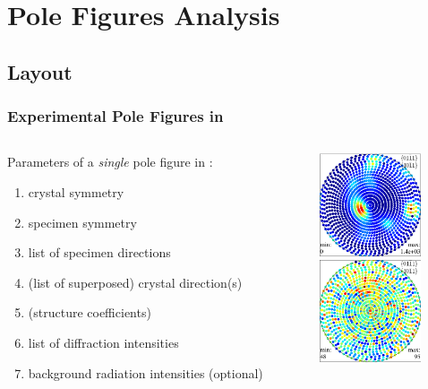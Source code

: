 \section{Pole Figures Analysis}

\subsection*{Layout}

\begin{frame}[fragile]
  \frametitle{Experimental Pole Figures in \MTEX}

  \begin{columns}

    \begin{column}{8.2cm}

      Parameters of a \textit{single} pole figure in \mtex:
      \begin{enumerate}
      \item crystal symmetry
      \item specimen symmetry
      \item list of specimen directions
      \item (list of superposed) crystal direction(s)
      \item (structure coefficients)
      \item list of diffraction intensities
      \item background radiation intensities (optional)
      \end{enumerate}

    \end{column}

    \begin{column}{3cm}
      \includegraphics[width=3cm]{pic/pf1}\\
      \includegraphics[width=3cm]{pic/pfso9_bg}
    \end{column}


  \end{columns}


\end{frame}


